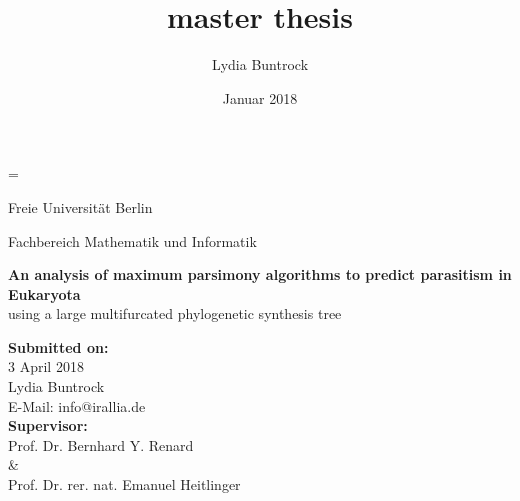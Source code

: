 
\author{Lydia Buntrock}
\title{master thesis}
\date{Januar 2018}

\hfuzz=\maxdimen {} 



  \begin{titlepage}
    \pagestyle{empty}
  	\begin{center}
      {\Large Freie Universität Berlin} \\
    	\begin{Huge}
      	Fachbereich Mathematik und Informatik \\
      	\vspace{3mm}
    	\end{Huge}
    	\vspace{2cm}
    	\begin{Large}
        \textbf{An analysis of maximum parsimony algorithms to predict parasitism in Eukaryota} \\
        \vspace{3mm}
        using a large multifurcated phylogenetic synthesis tree \\
    	\end{Large}
      \vspace{3cm}
      \textbf{Submitted on:} \\
      3 April 2018 \\
    	\vspace{2cm}
    	Lydia Buntrock \\
      E-Mail: info@irallia.de \\
     	\vspace{3cm}
      \textbf{Supervisor:} \\
      Prof. Dr. Bernhard Y. Renard \\
      \& \\
      Prof. Dr. rer. nat. Emanuel Heitlinger \\      
  	\end{center}
    \clearpage
  \end{titlepage}

